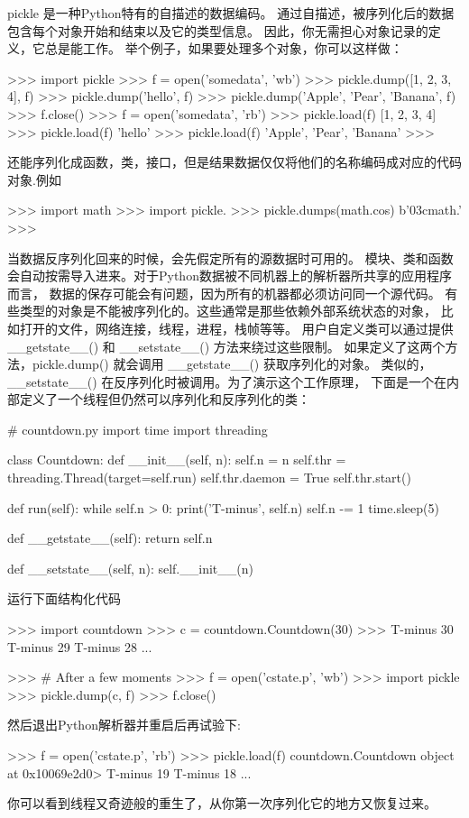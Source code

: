pickle 是一种Python特有的自描述的数据编码。 通过自描述，被序列化后的数据包含每个对象开始和结束以及它的类型信息。 因此，你无需担心对象记录的定义，它总是能工作。 举个例子，如果要处理多个对象，你可以这样做：
\begin{python}
>>> import pickle
>>> f = open('somedata', 'wb')
>>> pickle.dump([1, 2, 3, 4], f)
>>> pickle.dump('hello', f)
>>> pickle.dump({'Apple', 'Pear', 'Banana'}, f)
>>> f.close()
>>> f = open('somedata', 'rb')
>>> pickle.load(f)
[1, 2, 3, 4]
>>> pickle.load(f)
'hello'
>>> pickle.load(f)
{'Apple', 'Pear', 'Banana'}
>>>
\end{python}
还能序列化成函数，类，接口，但是结果数据仅仅将他们的名称编码成对应的代码对象.例如
\begin{python}
>>> import math
>>> import pickle.
>>> pickle.dumps(math.cos)
b'\x03cmath\ncos\nq{}.'
>>>
\end{python}
当数据反序列化回来的时候，会先假定所有的源数据时可用的。 模块、类和函数会自动按需导入进来。对于Python数据被不同机器上的解析器所共享的应用程序而言， 数据的保存可能会有问题，因为所有的机器都必须访问同一个源代码。
有些类型的对象是不能被序列化的。这些通常是那些依赖外部系统状态的对象， 比如打开的文件，网络连接，线程，进程，栈帧等等。 用户自定义类可以通过提供 \_\_getstate\_\_() 和 \_\_setstate\_\_() 方法来绕过这些限制。 如果定义了这两个方法，pickle.dump() 就会调用 \_\_getstate\_\_() 获取序列化的对象。 类似的，\_\_setstate\_\_() 在反序列化时被调用。为了演示这个工作原理， 下面是一个在内部定义了一个线程但仍然可以序列化和反序列化的类：
\begin{python}
# countdown.py
import time
import threading

class Countdown:
    def __init__(self, n):
        self.n = n
        self.thr = threading.Thread(target=self.run)
        self.thr.daemon = True
        self.thr.start()

    def run(self):
        while self.n > 0:
            print('T-minus', self.n)
            self.n -= 1
            time.sleep(5)

    def __getstate__(self):
        return self.n

    def __setstate__(self, n):
        self.__init__(n)
\end{python}
运行下面结构化代码
\begin{python}
>>> import countdown
>>> c = countdown.Countdown(30)
>>> T-minus 30
T-minus 29
T-minus 28
...

>>> # After a few moments
>>> f = open('cstate.p', 'wb')
>>> import pickle
>>> pickle.dump(c, f)
>>> f.close()
\end{python}
然后退出Python解析器并重启后再试验下:
\begin{python}
>>> f = open('cstate.p', 'rb')
>>> pickle.load(f)
countdown.Countdown object at 0x10069e2d0>
T-minus 19
T-minus 18
...
\end{python}
你可以看到线程又奇迹般的重生了，从你第一次序列化它的地方又恢复过来。

